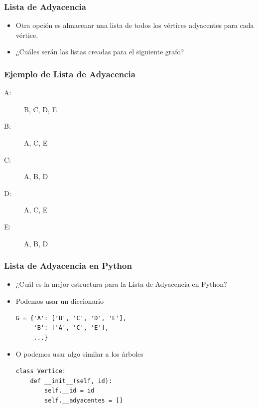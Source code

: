 \documentclass[11pt]{beamer}
\begin{document}
\begin{frame}\frametitle{Lista de Adyacencia}
\begin{itemize}
\item Otra opción es almacenar una lista de todos los vértices adyacentes para cada vértice.
\pause
\item ¿Cuáles serán las listas creadas para el siguiente grafo?
\end{itemize}
\begin{center}
\end{center}
\end{frame}


\begin{frame}\frametitle{Ejemplo de Lista de Adyacencia}
\begin{description}
\item[A:] B, C, D, E
\item[B:] A, C, E
\item[C:] A, B, D
\item[D:] A, C, E
\item[E:] A, B, D
\end{description}
\end{frame}

\begin{frame}[fragile]\frametitle{Lista de Adyacencia en Python}
\begin{itemize}
\item ¿Cuál es la mejor estructura para la Lista de Adyacencia en Python?
\pause
\item Podemos usar un diccionario
\begin{lstlisting}
G = {'A': ['B', 'C', 'D', 'E'], 
     'B': ['A', 'C', 'E'],
     ...}
\end{lstlisting}
\pause
\item O podemos usar algo similar a los árboles
\begin{lstlisting}
class Vertice:
    def __init__(self, id):
        self.__id = id
        self.__adyacentes = []
\end{lstlisting}
\end{itemize}
\end{frame}
\end{document}
